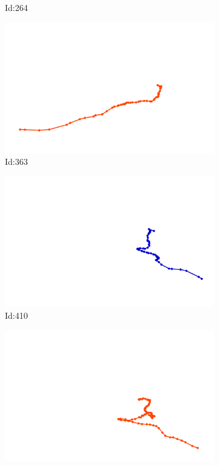 \documentclass[12pt,twoside]{report}
\begin{document}
\begin{figure}
\begin{subfigure}[b]{0.20\textwidth}
\caption{Id:264}
\end{subfigure}
\begin{subfigure}[b]{0.20\textwidth}
\centering
\includegraphics[width=\textwidth]{../../trajectories/363.png}
\caption{Id:363}
\end{subfigure}
\begin{subfigure}[b]{0.20\textwidth}
\centering
\includegraphics[width=\textwidth]{../../trajectories/410.png}
\caption{Id:410}
\end{subfigure}
\begin{subfigure}[b]{0.20\textwidth}
\centering
\includegraphics[width=\textwidth]{../../trajectories/454.png}

\end{subfigure}
\end{figure}
\end{document}
